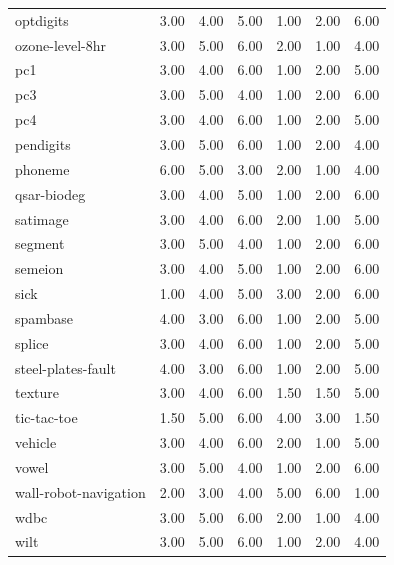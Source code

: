 \begin{table}[htbp]
\begin{tabular}{lrrrrrr}
optdigits & 3.00 & 4.00 & 5.00 & 1.00 & 2.00 & 6.00 \\
ozone-level-8hr & 3.00 & 5.00 & 6.00 & 2.00 & 1.00 & 4.00 \\
pc1 & 3.00 & 4.00 & 6.00 & 1.00 & 2.00 & 5.00 \\
pc3 & 3.00 & 5.00 & 4.00 & 1.00 & 2.00 & 6.00 \\
pc4 & 3.00 & 4.00 & 6.00 & 1.00 & 2.00 & 5.00 \\
pendigits & 3.00 & 5.00 & 6.00 & 1.00 & 2.00 & 4.00 \\
phoneme & 6.00 & 5.00 & 3.00 & 2.00 & 1.00 & 4.00 \\
qsar-biodeg & 3.00 & 4.00 & 5.00 & 1.00 & 2.00 & 6.00 \\
satimage & 3.00 & 4.00 & 6.00 & 2.00 & 1.00 & 5.00 \\
segment & 3.00 & 5.00 & 4.00 & 1.00 & 2.00 & 6.00 \\
semeion & 3.00 & 4.00 & 5.00 & 1.00 & 2.00 & 6.00 \\
sick & 1.00 & 4.00 & 5.00 & 3.00 & 2.00 & 6.00 \\
spambase & 4.00 & 3.00 & 6.00 & 1.00 & 2.00 & 5.00 \\
splice & 3.00 & 4.00 & 6.00 & 1.00 & 2.00 & 5.00 \\
steel-plates-fault & 4.00 & 3.00 & 6.00 & 1.00 & 2.00 & 5.00 \\
texture & 3.00 & 4.00 & 6.00 & 1.50 & 1.50 & 5.00 \\
tic-tac-toe & 1.50 & 5.00 & 6.00 & 4.00 & 3.00 & 1.50 \\
vehicle & 3.00 & 4.00 & 6.00 & 2.00 & 1.00 & 5.00 \\
vowel & 3.00 & 5.00 & 4.00 & 1.00 & 2.00 & 6.00 \\
wall-robot-navigation & 2.00 & 3.00 & 4.00 & 5.00 & 6.00 & 1.00 \\
wdbc & 3.00 & 5.00 & 6.00 & 2.00 & 1.00 & 4.00 \\
wilt & 3.00 & 5.00 & 6.00 & 1.00 & 2.00 & 4.00 \\
\hline
\end{tabular}
\end{table}
